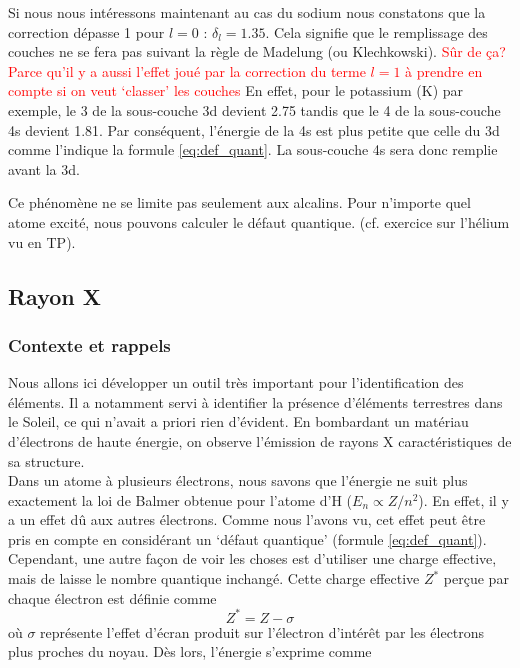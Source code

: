 Si nous nous intéressons maintenant au cas du sodium nous constatons que la correction dépasse 1 pour $l=0$ : $\delta_l = 1.35$. Cela signifie que le remplissage des couches ne se fera pas suivant la règle de Madelung (ou  Klechkowski). \textcolor{red}{Sûr de ça? Parce qu'il y a aussi l'effet joué par la correction du terme $l=1$ à prendre en compte si on veut `classer' les couches}
En effet, pour le potassium (K) par exemple, le 3 de la sous-couche 3d devient 2.75 tandis que le 4 de la sous-couche 4s devient 1.81. Par conséquent, l’énergie de la 4s est plus petite que celle du 3d comme l'indique la formule \ref{eq:def_quant}. La sous-couche 4s sera donc remplie avant la 3d.

Ce phénomène ne se limite pas seulement aux alcalins. Pour  n'importe quel atome excité, nous pouvons calculer le défaut quantique. (cf. exercice sur l'hélium vu en TP).




\subsection{Rayon X}
\subsubsection{Contexte et rappels}


Nous allons ici développer un outil très important pour l'identification des éléments. Il a notamment servi à identifier la présence d'éléments terrestres dans le Soleil, ce qui n'avait a priori rien d'évident. En bombardant un matériau d'électrons de haute énergie, on observe l'émission de rayons X caractéristiques de sa structure.\\

Dans un atome à plusieurs électrons, nous savons que l'énergie ne suit plus exactement la loi de Balmer obtenue pour l'atome d'H ($E_n \propto Z/n^2$). En effet, il y a un effet dû aux autres électrons. Comme nous l'avons vu, cet effet peut être pris en compte en considérant un `défaut quantique' (formule \ref{eq:def_quant}). Cependant, une autre façon de voir les choses est d'utiliser une charge effective, mais de laisse le nombre quantique inchangé. Cette charge effective $Z^{*}$ perçue par chaque électron est définie comme \[ Z^{*}=Z-\sigma \] où $\sigma$ représente l'effet d'écran produit sur l'électron d'intérêt par les électrons plus proches du noyau. Dès lors, l'énergie s'exprime comme

